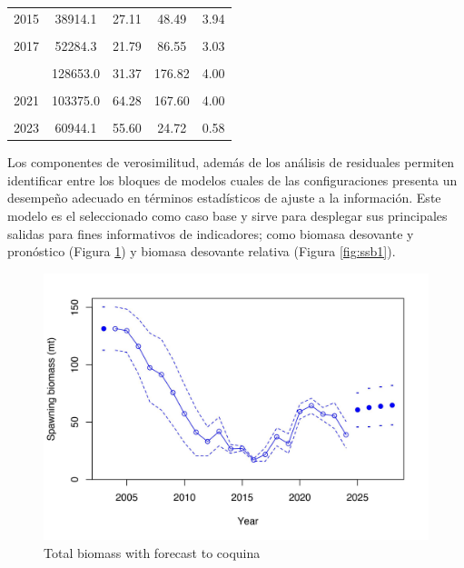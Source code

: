 \documentclass[
]{article}
\begin{document}
\begin{table}[ht!]
\begin{tabular}[t]{ccccc}
2015 & 38914.1 & 27.11 & 48.49 & 3.94\\
\cellcolor{gray!6}{2016} & \cellcolor{gray!6}{58124.2} & \cellcolor{gray!6}{17.08} & \cellcolor{gray!6}{34.99} & \cellcolor{gray!6}{1.57}\\
2017 & 52284.3 & 21.79 & 86.55 & 3.03\\
\cellcolor{gray!6}{2018} & \cellcolor{gray!6}{119431.0} & \cellcolor{gray!6}{37.18} & \cellcolor{gray!6}{72.14} & \cellcolor{gray!6}{2.85}\\
\addlinespace
2019 & 128653.0 & 31.37 & 176.82 & 4.00\\
\cellcolor{gray!6}{2020} & \cellcolor{gray!6}{111082.0} & \cellcolor{gray!6}{59.33} & \cellcolor{gray!6}{191.15} & \cellcolor{gray!6}{4.00}\\
2021 & 103375.0 & 64.28 & 167.60 & 4.00\\
\cellcolor{gray!6}{2022} & \cellcolor{gray!6}{46126.8} & \cellcolor{gray!6}{56.98} & \cellcolor{gray!6}{135.34} & \cellcolor{gray!6}{2.91}\\
2023 & 60944.1 & 55.60 & 24.72 & 0.58\\
\bottomrule
\end{tabular}
\end{table}

Los componentes de verosimilitud, además de los análisis de residuales permiten identificar entre los bloques de modelos cuales de las configuraciones presenta un desempeño adecuado en términos estadísticos de ajuste a la información. Este modelo es el seleccionado como caso base y sirve para desplegar sus principales salidas para fines informativos de indicadores; como biomasa desovante y pronóstico (Figura \ref{fig:ssb}) y biomasa desovante relativa (Figura \ref{fig:ssb1}).

\begin{figure}[H]

{\centering \includegraphics[width=0.8\linewidth]{Dtrunculus_SS3_2024_files/figure-latex/ssb-1} 

}

\caption{\label{ssb}Total biomass with forecast to coquina}\label{fig:ssb}
\end{figure}
\end{document}
